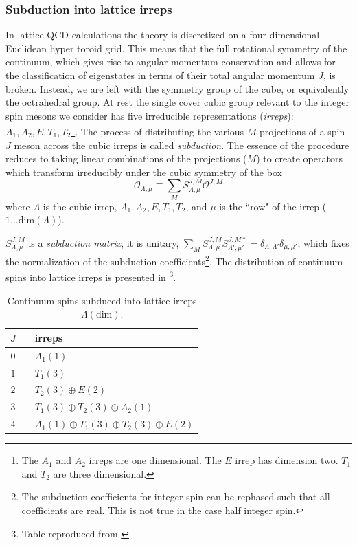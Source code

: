 \subsubsection{Subduction into lattice irreps} \label{Spec::Subduce}
In lattice QCD calculations the theory is discretized on a four dimensional Euclidean hyper toroid grid. This means that the full rotational symmetry of the continuum, which gives rise to angular momentum conservation and allows for the classification of eigenstates in terms of their total angular momentum $J$, is broken. Instead, we are left with the symmetry group of the cube, or equivalently the octrahedral group. At rest the single cover cubic group relevant to the integer spin mesons we consider has five irreducible representations (\emph{irreps}): $A_1,A_2,E,T_1,T_2$\footnote{The $A_1$ and $A_2$ irreps are one dimensional. The $E$ irrep has dimension two.  $T_1$ and $T_2$ are three dimensional.}. The process of distributing the various $M$ projections of a spin $J$ meson across the cubic irreps is called \emph{subduction}. The essence of the procedure reduces to taking linear combinations of the projections ($M$) to create operators which transform irreducibly under the cubic symmetry of the box
\begin{equation}
\mathcal{O}_{\Lambda,\mu} \equiv \sum_M S^{J,M}_{\Lambda,\mu}\mathcal{O}^{J,M} 
\end{equation} 
where $\Lambda$ is the cubic irrep, $A_1,A_2,E,T_1,T_2$, and $\mu$ is the ``row" of the irrep ($1\ldots \mathrm{dim}(\Lambda)$). 

 $S^{J,M}_{\Lambda,\mu}$ is a \emph{subduction matrix}, it is unitary, $\sum_{M} S^{J,M}_{\Lambda,\mu} S^{J,M*}_{\Lambda',\mu'} = \delta_{\Lambda,\Lambda'}\delta_{\mu,\mu'}$, which fixes the normalization of the subduction coefficients\footnote{The subduction coefficients for integer spin can be rephased such that all coefficients are real. This is not true in the case half integer spin.}.  The distribution of continuum spins into lattice irreps is presented in  \footnote{Table reproduced from \cite{Dudek:2010wm}}. 
 
\begin{table}[htbp]
\caption{Continuum spins subduced into lattice irreps $\Lambda(\mathrm{dim})$.\label{tab::subduce}}
\begin{center}
\begin{tabular}{ccl}
$J$ & & irreps \\
\hline
$0$ & & $A_1(1)$ \\
$1$ & & $T_1(3)$ \\
$2$ & & $T_2(3) \oplus E(2)$\\
$3$ & & $T_1(3) \oplus T_2(3) \oplus A_2(1)$\\
$4$ & & $A_1(1) \oplus T_1(3) \oplus T_2(3) \oplus E(2)$
\end{tabular}  
\end{center}
\end{table}
 

